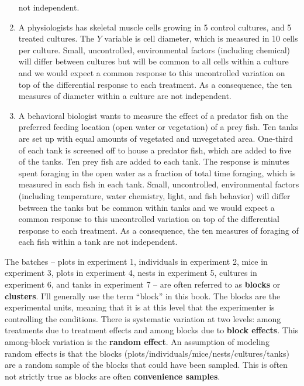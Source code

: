 \documentclass[]{book}
\begin{document}
\begin{enumerate}
  not independent.
\item
  A physiologists has skeletal muscle cells growing in 5 control
  cultures, and 5 treated cultures. The \(Y\) variable is cell diameter,
  which is measured in 10 cells per culture. Small, uncontrolled,
  environmental factors (including chemical) will differ between
  cultures but will be common to all cells within a culture and we would
  expect a common response to this uncontrolled variation on top of the
  differential response to each treatment. As a consequence, the ten
  measures of diameter within a culture are not independent.
\item
  A behavioral biologist wants to measure the effect of a predator fish
  on the preferred feeding location (open water or vegetation) of a prey
  fish. Ten tanks are set up with equal amounts of vegetated and
  unvegetated area. One-third of each tank is screened off to house a
  predator fish, which are added to five of the tanks. Ten prey fish are
  added to each tank. The response is minutes spent foraging in the open
  water as a fraction of total time foraging, which is measured in each
  fish in each tank. Small, uncontrolled, environmental factors
  (including temperature, water chemistry, light, and fish behavior)
  will differ between the tanks but be common within tanks and we would
  expect a common response to this uncontrolled variation on top of the
  differential response to each treatment. As a consequence, the ten
  measures of foraging of each fish within a tank are not independent.
\end{enumerate}

The batches -- plots in experiment 1, individuals in experiment 2, mice
in experiment 3, plots in experiment 4, nests in experiment 5, cultures
in experiment 6, and tanks in experiment 7 -- are often referred to as
\textbf{blocks} or \textbf{clusters}. I'll generally use the term
``block'' in this book. The blocks are the experimental units, meaning
that it is at this level that the experimenter is controlling the
conditions. There is systematic variation at two levels: among
treatments due to treatment effects and among blocks due to
\textbf{block effects}. This among-block variation is the \textbf{random
effect}. An assumption of modeling random effects is that the blocks
(plots/individuals/mice/nests/cultures/tanks) are a random sample of the
blocks that could have been sampled. This is often not strictly true as
blocks are often \textbf{convenience samples}.
\end{document}
